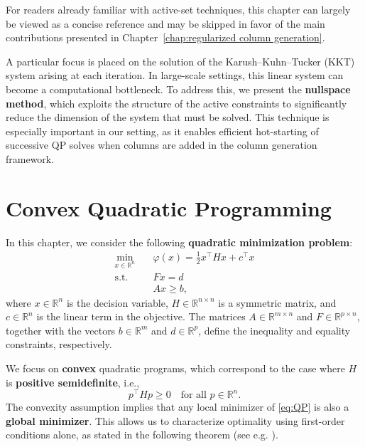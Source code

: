 \documentclass{book}
\theoremstyle{definition}
\numberwithin{algorithm_}{chapter}
\begin{document}
\medskip

For readers already familiar with active-set techniques, this chapter can largely be viewed as a concise reference and may be skipped in favor of the main contributions presented in Chapter~\ref{chap:regularized column generation}.

\medskip

A particular focus is placed on the solution of the Karush--Kuhn--Tucker (KKT) system arising at each iteration. In large-scale settings, this linear system can become a computational bottleneck. To address this, we present the \textbf{nullspace method}, which exploits the structure of the active constraints to significantly reduce the dimension of the system that must be solved. This technique is especially important in our setting, as it enables efficient hot-starting of successive QP solves when columns are added in the column generation framework.

\vspace*{\fill}

\newpage

\section{Convex Quadratic Programming}

In this chapter, we consider the following \textbf{quadratic minimization problem}:
\begin{subequations} \label{eq:QP}
\begin{align}
\min_{x \in \mathbb{R}^n} \quad & \varphi(x) = \frac{1}{2} x^\top H x + c^\top x \label{eq:QP_obj} \\[1mm]
\text{s.t.} \quad & F x = d \label{eq:QP_eq} \\[1mm]
& A x \ge b, \label{eq:QP_ineq}
\end{align}
\end{subequations}
where \(x \in \mathbb{R}^n\) is the decision variable, \(H \in \mathbb{R}^{n \times n}\) is a symmetric matrix, and \(c \in \mathbb{R}^n\) is the linear term in the objective. The matrices \(A \in \mathbb{R}^{m \times n}\) and \(F \in \mathbb{R}^{p \times n}\), together with the vectors \(b \in \mathbb{R}^m\) and \(d \in \mathbb{R}^p\), define the inequality and equality constraints, respectively. 

\bigskip

We focus on \textbf{convex} quadratic programs, which correspond to the case where \(H\) is \textbf{positive semidefinite}, i.e.,
\[
p^\top H p \ge 0 \quad \text{for all } p \in \mathbb{R}^n.
\]
The convexity assumption implies that any local minimizer of \eqref{eq:QP} is also a \textbf{global minimizer}. 
This allows us to characterize optimality using first-order conditions alone, as stated in the following theorem (see e.g. \cite{nocedal2006numerical}). 
\end{document}
